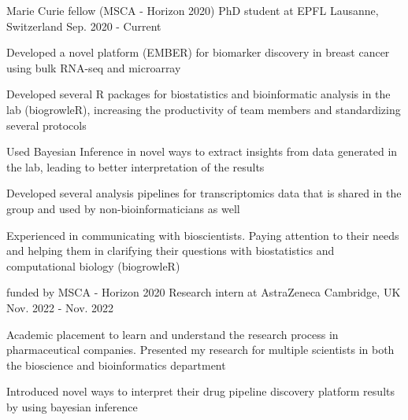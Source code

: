 




\begin{cventries}

  \cventry
    {Marie Curie fellow (MSCA - Horizon 2020)}
    {PhD student at EPFL}
    {Lausanne, Switzerland} 
    {Sep. 2020 - Current} 
    {
      \begin{cvitems} 
        \item {Developed a novel platform (EMBER) for biomarker discovery in breast
               cancer using bulk RNA-seq and microarray}
        \item {Developed several R packages for biostatistics and bioinformatic
                analysis in the lab (biogrowleR), increasing the productivity of
                team members and standardizing several protocols} 
        \item {Used Bayesian Inference in novel ways to extract insights from 
               data generated in the lab, leading to better
               interpretation of the results}
        \item { Developed several analysis pipelines for transcriptomics
                data that is shared in the group and used by non-bioinformaticians as well}
        \item {Experienced in communicating with bioscientists. Paying attention to their
                needs and helping them in clarifying their questions with biostatistics 
                and computational biology (biogrowleR)}
      \end{cvitems} 
    }


\begin{cventries}

  \cventry
    {funded by MSCA - Horizon 2020}
    {Research intern at AstraZeneca}
    {Cambridge, UK} 
    {Nov. 2022 - Nov. 2022} 
    {
      \begin{cvitems} 
        \item {Academic placement to learn and understand the research 
            process in
            pharmaceutical companies. Presented my research for
            multiple scientists in both the bioscience and bioinformatics
            department}
        \item {Introduced novel ways to interpret their drug pipeline discovery platform
                results by using bayesian inference}
      \end{cvitems} 
    }


\end{cventries}
\end{cventries}
